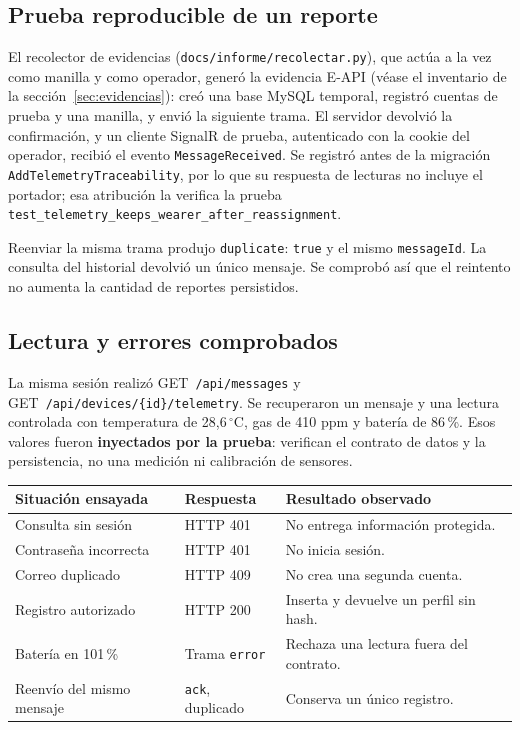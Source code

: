 \documentclass[10pt,a4paper]{article}
\newcommand{\code}[1]{{\small\urlstyle{tt}\nolinkurl{#1}}}
\begin{document}
\subsection{Prueba reproducible de un reporte}
El recolector de evidencias (\code{docs/informe/recolectar.py}), que actúa a la vez como manilla y como operador, generó la evidencia E-API (véase el inventario de la sección~\ref{sec:evidencias}): creó una base MySQL temporal, registró cuentas de prueba y una manilla, y envió la siguiente trama. El servidor devolvió la confirmación, y un cliente SignalR de prueba, autenticado con la cookie del operador, recibió el evento \code{MessageReceived}. Se registró antes de la migración \code{AddTelemetryTraceability}, por lo que su respuesta de lecturas no incluye el portador; esa atribución la verifica la prueba \code{test_telemetry_keeps_wearer_after_reassignment}.




Reenviar la misma trama produjo \code{duplicate}: \code{true} y el mismo \code{messageId}. La consulta del historial devolvió un único mensaje. Se comprobó así que el reintento no aumenta la cantidad de reportes persistidos.

\subsection{Lectura y errores comprobados}
La misma sesión realizó GET~\code{/api/messages} y GET~\code{/api/devices/{id}/telemetry}. Se recuperaron un mensaje y una lectura controlada con temperatura de 28,6\,$^\circ$C, gas de 410 ppm y batería de 86\,\%. Esos valores fueron \textbf{inyectados por la prueba}: verifican el contrato de datos y la persistencia, no una medición ni calibración de sensores.

\label{tab:errores}
\begin{tabularx}{\linewidth}{@{}P{52mm}P{26mm}Y@{}}
\toprule\textbf{Situación ensayada} & \textbf{Respuesta} & \textbf{Resultado observado}\\\midrule
Consulta sin sesión & HTTP 401 & No entrega información protegida.\\
Contraseña incorrecta & HTTP 401 & No inicia sesión.\\
Correo duplicado & HTTP 409 & No crea una segunda cuenta.\\
Registro autorizado & HTTP 200 & Inserta y devuelve un perfil sin hash.\\
Batería en 101\,\% & Trama \code{error} & Rechaza una lectura fuera del contrato.\\
Reenvío del mismo mensaje & \code{ack}, duplicado & Conserva un único registro.\\\bottomrule
\end{tabularx}
\end{document}

